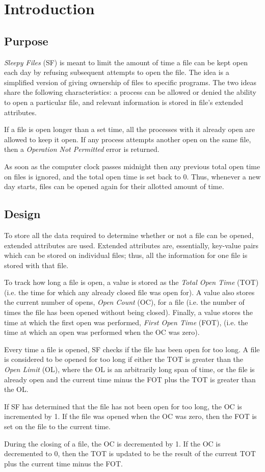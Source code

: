 \section{Introduction}

\subsection{Purpose}

\textit{Sleepy Files} (SF) is meant to limit the amount of time a file can be kept open each day by refusing subsequent attempts to open the file. The idea is a simplified version of giving ownership of files to specific programs. The two ideas share the following characteristics: a process can be allowed or denied the ability to open a particular file, and relevant information is stored in file's extended attributes.

If a file is open longer than a set time, all the processes with it already open are allowed to keep it open. If any process attempts another open on the same file, then a \textit{Operation Not Permitted} error is returned.

As soon as the computer clock passes midnight then any previous total open time on files is ignored, and the total open time is set back to 0. Thus, whenever a new day starts, files can be opened again for their allotted amount of time.

\subsection{Design}

To store all the data required to determine whether or not a file can be opened, extended attributes are used. Extended attributes are, essentially, key-value pairs which can be stored on individual files; thus, all the information for one file is stored with that file.

To track how long a file is open, a value is stored as the \textit{Total Open Time} (TOT) (i.e. the time for which any already closed file was open for). A value also stores the current number of opens, \textit{Open Count} (OC), for a file (i.e. the number of times the file has been opened without being closed). Finally, a value stores the time at which the first open was performed, \textit{First Open Time} (FOT), (i.e. the time at which an open was performed when the OC was zero).

Every time a file is opened, SF checks if the file has been open for too long. A file is considered to be opened for too long if either the TOT is greater than the \textit{Open Limit} (OL), where the OL is an arbitrarily long span of time, or the file is already open and the current time minus the FOT plus the TOT is greater than the OL.

If SF has determined that the file has not been open for too long, the OC is incremented by 1. If the file was opened when the OC was zero, then the FOT is set on the file to the current time.

During the closing of a file, the OC is decremented by 1. If the OC is decremented to 0, then the TOT is updated to be the result of the current TOT plus the current time minus the FOT.